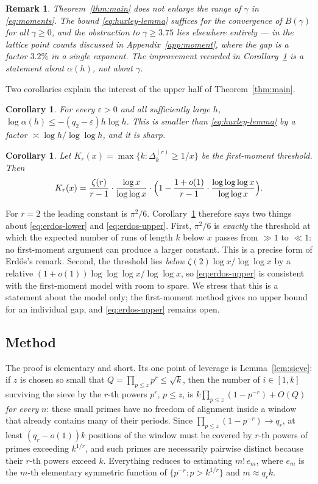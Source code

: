 \documentclass[10pt,a4paper]{amsart}
\newtheorem{corollary}[theorem]{Corollary}
\newtheorem{remark}[theorem]{Remark}
\numberwithin{equation}{section}
\begin{document}
\begin{remark}\label{rem:nogain}
Theorem~\ref{thm:main} does \emph{not} enlarge the range of $\gamma$ in
\eqref{eq:moments}. The bound \eqref{eq:huxley-lemma} suffices for the convergence of
$B(\gamma)$ for all $\gamma\ge0$, and the obstruction to $\gamma\ge3.75$ lies elsewhere
entirely --- in the lattice point counts discussed in Appendix~\ref{app:moment}, where the
gap is a factor $3.2\%$ in a single exponent. The improvement recorded in
Corollary~\ref{cor:huxley} is a statement about $\alpha(h)$, not about $\gamma$.
\end{remark}

Two corollaries explain the interest of the upper half of Theorem~\ref{thm:main}.

\begin{corollary}\label{cor:huxley}
For every $\varepsilon>0$ and all sufficiently large $h$,
$\log\alpha(h)\le-(q_2-\varepsilon)h\log h$. This is smaller than
\eqref{eq:huxley-lemma} by a factor $\asymp\log h/\log\log h$, and it is sharp.
\end{corollary}

\begin{corollary}\label{cor:threshold}
Let $K_r(x)=\max\{k:\Delta^{(r)}_k\ge1/x\}$ be the first-moment threshold. Then
\[
  K_r(x)=\frac{\zeta(r)}{r-1}\cdot\frac{\log x}{\log\log x}\cdot
  \Bigl(1-\frac{1+o(1)}{r-1}\cdot\frac{\log\log\log x}{\log\log x}\Bigr).
\]
\end{corollary}

For $r=2$ the leading constant is $\pi^{2}/6$. Corollary~\ref{cor:threshold} therefore says
two things about \eqref{eq:erdos-lower} and \eqref{eq:erdos-upper}. First, $\pi^{2}/6$ is
\emph{exactly} the threshold at which the expected number of runs of length $k$ below $x$
passes from $\gg1$ to $\ll1$: no first-moment argument can produce a larger constant. This
is a precise form of Erd\H{o}s's remark. Second, the threshold lies \emph{below}
$\zeta(2)\log x/\log\log x$ by a relative $(1+o(1))\log\log\log x/\log\log x$, so
\eqref{eq:erdos-upper} is consistent with the first-moment model with room to spare. We
stress that this is a statement about the model only; the first-moment method gives no
upper bound for an individual gap, and \eqref{eq:erdos-upper} remains open.

\subsection*{Method}
The proof is elementary and short. Its one point of leverage is Lemma~\ref{lem:sieve}: if
$z$ is chosen so small that $Q=\prod_{p\le z}p^{r}\le\sqrt k$, then the number of
$i\in[1,k]$ surviving the sieve by the $r$-th powers $p^{r}$, $p\le z$, is
$k\prod_{p\le z}(1-p^{-r})+O(Q)$ \emph{for every} $n$: these small primes have no freedom
of alignment inside a window that already contains many of their periods. Since
$\prod_{p\le z}(1-p^{-r})\to q_r$, at least $(q_r-o(1))k$ positions of the window must be
covered by $r$-th powers of primes exceeding $k^{1/r}$, and such primes are necessarily
pairwise distinct because their $r$-th powers exceed $k$. Everything reduces to estimating
$m!\,e_m$, where $e_m$ is the $m$-th elementary symmetric function of
$\{p^{-r}:p>k^{1/r}\}$ and $m\approx q_rk$.
\end{document}
